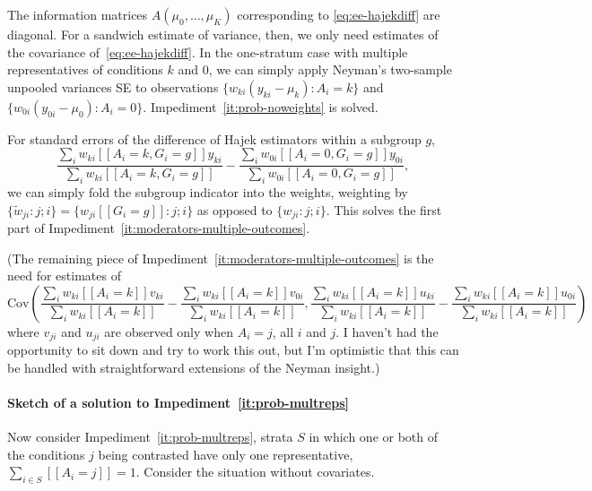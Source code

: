 The information matrices $A(\mu_0, \ldots, \mu_K)$ corresponding to
\eqref{eq:ee-hajekdiff} are diagonal.  For a sandwich estimate of
variance, then, we only need estimates of the covariance
of~\eqref{eq:ee-hajekdiff}.  In the one-stratum case with multiple
representatives of conditions $k$ and $0$, we can simply apply
Neyman's two-sample unpooled variances SE to observations $\{ w_{ki}
(y_{ki} - \mu_k) : A_i = k\}$ and $\{ w_{0i} (y_{0i} - \mu_0) : A_i =
0\}$.  Impediment~\ref{it:prob-noweights} is solved. 

For standard errors of the difference of Hajek estimators within a
subgroup $g$,
\begin{equation*}
 \frac{\sum_i w_{ki} [\![A_i=k, G_{i} =g]\!] y_{ki}}{\sum_i w_{ki}
     [\![A_i=k, G_{i}=g]\!]}
 -
  \frac{\sum_i w_{0i} [\![A_i=0, G_{i} =g]\!] y_{0i}}{\sum_i w_{0i}
     [\![A_i=0, G_{i}=g]\!]},
\end{equation*}
we can simply fold the subgroup indicator into the weights,
weighting by $\{\tilde{w}_{ji}:j; i\} = \{w_{ji}[\![G_{i}=g]\!]: j; i\}$ as opposed to $\{w_{ji}:j;
i\}$. This solves the first part of
Impediment~\ref{it:moderators-multiple-outcomes}.

(The remaining piece of Impediment~\ref{it:moderators-multiple-outcomes}
is the need for estimates of
\begin{equation*}
  \mathrm{Cov}\left(
    \frac{\sum_i w_{ki} [\![A_i=k]\!] v_{ki}}{\sum_i w_{ki}
      [\![A_i=k]\!]} -
    \frac{\sum_i w_{ki} [\![A_i=k]\!] v_{0i}}{\sum_i w_{ki}  [\![A_i=k]\!]},
  \frac{\sum_i {w}_{ki} [\![A_i=k]\!] u_{ki}}{\sum_i {w}_{ki}
      [\![A_i=k]\!]} -
    \frac{\sum_i {w}_{ki} [\![A_i=k]\!] u_{0i}}{\sum_i {w}_{ki}  [\![A_i=k]\!]}
  \right)
\end{equation*}
where $v_{ji}$ and $u_{ji}$ are observed only
when $A_{i}=j$, all $i$ and $j$.   I haven't had the opportunity to
sit down and try to work this out, but I'm optimistic that this
can be handled with straightforward extensions of the Neyman insight.)

\paragraph*{Sketch of a solution to Impediment~\ref{it:prob-multreps}}
Now consider Impediment~\ref{it:prob-multreps},  strata $S$ in which one
or both of the conditions $j$ being contrasted have only one 
representative, $\sum_{i\in S} [\![A_{i}=j]\!] =1$. Consider the situation without covariates. 

